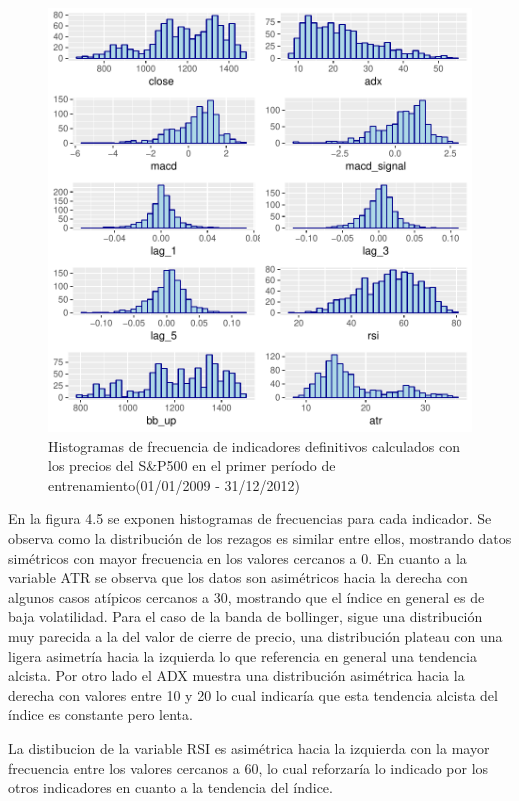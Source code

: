 \documentclass[a4paper,12pt]{Latex/Classes/PhDthesisPSnPDF}
\begin{document}
\begin{figure}[H]
\centering
\includegraphics{main-010}
\caption{Histogramas de frecuencia de indicadores definitivos calculados con los precios del S\&P500 en el primer período de entrenamiento(01/01/2009 - 31/12/2012)}
\end{figure}

En la figura 4.5 se exponen histogramas de frecuencias para cada indicador. Se observa como la distribución de los rezagos es similar entre ellos, mostrando datos simétricos con mayor frecuencia en los valores cercanos a 0. En cuanto a la variable ATR se observa que los datos son asimétricos hacia la derecha con algunos casos atípicos cercanos a 30, mostrando que el índice en general es de baja volatilidad. Para el caso de la banda de bollinger, sigue una distribución muy parecida a la del valor de cierre de precio, una distribución plateau con una ligera asimetría hacia la izquierda lo que referencia en general una tendencia alcista. Por otro lado el ADX muestra una distribución asimétrica hacia la derecha con valores entre 10 y 20 lo cual indicaría que esta tendencia alcista del índice es constante pero lenta. 

La distibucion de la variable RSI es asimétrica hacia la izquierda con la mayor frecuencia entre los valores cercanos a 60, lo cual reforzaría lo indicado por los otros indicadores en cuanto a la tendencia del índice.
\end{document}
